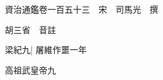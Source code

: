 






























































資治通鑑卷一百五十三　宋　司馬光　撰

胡三省　音註

梁紀九|{
	屠維作噩一年}


高祖武皇帝九

